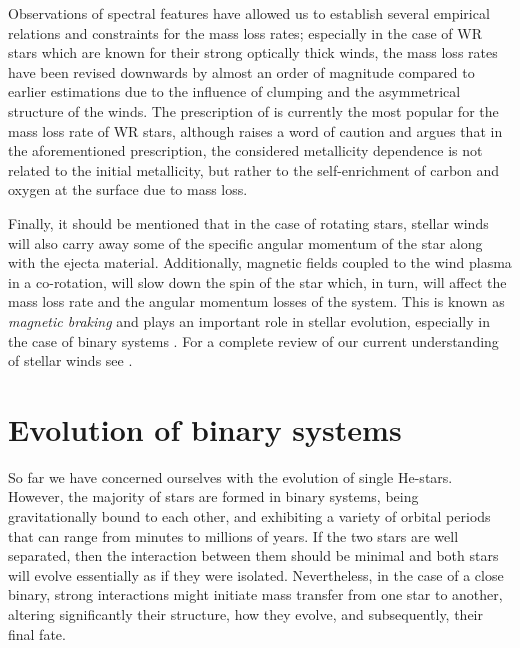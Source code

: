 \documentclass[../../main/thesis_msc.tex]{subfiles}
\begin{document}
						Observations of spectral features have allowed us to establish several empirical relations and constraints for the mass loss rates; especially in the case of WR stars which are known for their strong optically thick winds, the mass loss rates have been revised downwards by almost an order of magnitude \citep{Nugis2000} compared to earlier estimations \citep{Hamann1995, Langer1989} due to the influence of clumping and the asymmetrical structure of the winds. The prescription of \cite{Nugis2000} is currently the most popular for the mass loss rate of WR stars, although \cite{yoon17} raises a word of caution and argues that in the aforementioned prescription, the considered metallicity dependence is not related to the initial metallicity, but rather to the self-enrichment of carbon and oxygen at the surface due to mass loss.
						
						Finally, it should be mentioned that in the case of rotating stars, stellar winds will also carry away some of the specific angular momentum of the star along with the ejecta material. Additionally, magnetic fields coupled to the wind plasma in a co-rotation, will slow down the spin of the star which, in turn, will affect the mass loss rate and the angular momentum losses of the system. This is known as \emph{magnetic braking} and plays an important role in stellar evolution, especially in the case of binary systems \citep[see][]{Ivanova2003}. For a complete review of our current understanding of stellar winds see \cite{Lamers, smith14}.
						
					
				
	\section{Evolution of binary systems}
	
		So far we have concerned ourselves with the evolution of single He-stars. However, the majority of stars are formed in binary systems, being gravitationally bound to each other, and exhibiting a variety of orbital periods that can range from minutes to millions of years. If the two stars are well separated, then the interaction between them should be minimal and both stars will evolve essentially as if they were isolated. Nevertheless, in the case of a close binary, strong interactions might initiate mass transfer from one star to another, altering significantly their structure, how they evolve, and subsequently, their final fate.
		
\end{document}
